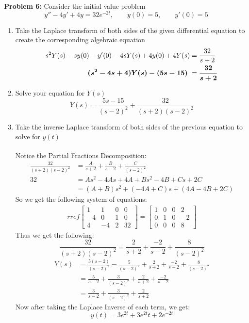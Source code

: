 \documentclass[12pt]{article}
\begin{document}
\newpage 

\noindent \textbf{Problem 6: }Consider the initial value problem
	$$
	y'' - 4y' + 4y = 32e^{-2t}, \qquad y(0) = 5, \qquad y'(0) = 5
	$$
	\begin{enumerate}[label = (\alph*)]
		\item Take the Laplace transform of both sides of the given differential equation to create the corresponding algebraic equation
			\begin{align*}
				s^2Y(s) - sy(0) - y'(0) - 4sY(s) + 4y(0) + 4Y(s) &= \frac{32}{s + 2} \\
				\text{\boldmath $(s^2 - 4s + 4)Y(s) - (5s - 15)$ }&= \text{\boldmath $\frac{32}{s + 2}$}
			\end{align*}
		\item Solve your equation for $Y(s)$
			\boldmath
			$$
			Y(s) = \frac{5s - 15}{(s-2)^2} + \frac{32}{(s+2)(s-2)^2}
			$$		
			\unboldmath
		\item Take the inverse Laplace transform of both sides of the previous equation to solve for $y(t)$
		\\ \\
		Notice the Partial Fractions Decomposition:
			\begin{align*}
				\frac{32}{(s+2)(s-2)^2} &= \frac{A}{s+2} + \frac{B}{s-2} + \frac{C}{(s-2)^2} \\
				32 &= As^2 - 4As + 4A + Bs^2 - 4B + Cs + 2C \\
				&= (A + B)s^2 + (-4A + C)s + (4A - 4B + 2C)  
			\end{align*}
		So we get the following system of equations:
			\begin{align*}
				rref
				\begin{bmatrix}
					1 & 1 & 0 & 0 \\
					-4 & 0 & 1 & 0 \\
					4 & -4 & 2 & 32
				\end{bmatrix}
				=
				\begin{bmatrix}
					1 & 0 & 0 & 2 \\
					0 & 1 & 0 & -2 \\
					0 & 0 & 0 & 8
				\end{bmatrix}
			\end{align*}
		Thus we get the following:
			$$
			\frac{32}{(s+2)(s-2)^2} = \frac{2}{s+2} + \frac{-2}{s-2} + \frac{8}{(s-2)^2}
			$$
			\begin{align*}
				Y(s) &= \frac{5(s-2)}{(s-2)^2} - \frac{5}{(s-2)^2} + \frac{2}{s+2} + \frac{-2}{s-2} + \frac{8}{(s-2)^2} \\ 
				&= \frac{5}{s-2} +  \frac{3}{(s-2)^2} + \frac{2}{s+2} + \frac{-2}{s-2} \\
				&= \frac{3}{s-2} +  \frac{3}{(s-2)^2} + \frac{2}{s+2} 
			\end{align*}
		Now after taking the Laplace Inverse of each term, we get:
			\boldmath
			$$
			y(t) = 3e^{2t} + 3e^{2t}t + 2e^{-2t}
			$$
			\unboldmath
	\end{enumerate}
\end{document}
